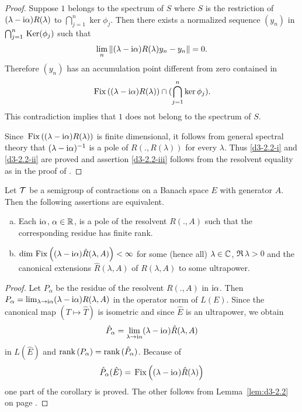 \begin{proof}
Suppose $1$ belongs to the spectrum of $S$ where $S$ is the restriction of 
$(\lambda-\mathrm{i}\alpha)R(\lambda)$ to $\bigcap_{j=1}^{n} \ker\phi_{j}$.
Then there exists a normalized sequence $(y_{n})$ in 
$\bigcap_{j=1}^{n} \mathop{}\mathrm{Ker}(\phi_{j})$ such that
\[
\lim_{n} \|(\lambda - \mathrm{i}\alpha)R(\lambda)y_{n} - y_{n}\| = 0 .
\]
Therefore $(y_{n})$ has an accumulation point different from zero contained in
\[
\mathop{}\mathrm{Fix}\left((\lambda - \mathrm{i}\alpha)R(\lambda)\right) \cap (\bigcap_{j=1}^{n} \ker\phi_{j}) .
\]
This contradiction implies that $1$ does not belong to the spectrum of $S$.

Since $\mathop{}\mathrm{Fix}\left((\lambda - \mathrm{i}\alpha)R(\lambda)\right)$ is finite dimensional, it follows from general spectral theory that $(\lambda - \mathrm{i}\alpha)^{-1}$ is a pole of $R(.,R(\lambda))$ for every $\lambda$.
Thus \ref{d3-2.2-i} and \ref{d3-2.2-ii} are proved and assertion \ref{d3-2.2-iii} follows from the resolvent equality as in the proof of \citet[Proposition 1.2]{greiner:1981}.
\end{proof}
\begin{proposition}\label{prop:d3-2.3}
Let $\mathcal{T}$ be a semigroup of contractions on a Banach space $E$ with generator $A$.
Then the following assertions are equivalent.
\begin{enumerate}[(a)]

\item
Each $\mathrm{i}\alpha$, $\alpha \in \mathbb{R}$, is a pole of the resolvent $R(.,A)$ such that the corresponding residue has finite rank.

\item
$\dim \mathop{}\mathrm{Fix}\left((\lambda - \mathrm{i}\alpha)\hat{R}(\lambda,A)\right) < \infty$ for some (hence all) $\lambda \in \mathbb{C}$, $\Re\,\lambda > 0$ and the canonical extensions $\hat{R}(\lambda,A)$ of $R(\lambda,A)$ to some ultrapower.

\end{enumerate}
\end{proposition}
\begin{proof}
Let $P_{\alpha}$ be the residue of the resolvent $R(.,A)$ in $\mathrm{i}\alpha$.
Then $P_{\alpha} = \lim_{\lambda \to \mathrm{i}\alpha}(\lambda - \mathrm{i}\alpha)R(\lambda,A)$ in the operator norm of $L(E)$.
Since the canonical map $(T \mapsto \hat{T})$ is isometric and since $\hat{E}$ is an ultrapower, we obtain
\[
\hat{P}_{\alpha} = \lim_{\lambda \to \mathrm{i}\alpha}(\lambda - \mathrm{i}\alpha)\hat{R}(\lambda,A)
\]
in $L(\hat{E})$ and $\mathop{}\!\mathrm{rank}\,(P_{\alpha}) = \mathop{}\!\mathrm{rank}\,(\hat{P}_{\alpha})$.
Because of
\[
\hat{P}_{\alpha}(\hat{E}) = \mathop{}\mathrm{Fix}\left((\lambda-\mathrm{i}\alpha)\hat{R}(\lambda)\right)
\]
one part of the corollary is proved. The other follows from Lemma~\ref{lem:d3-2.2} on page \pageref{lem:d3-2.2}.
\end{proof}
